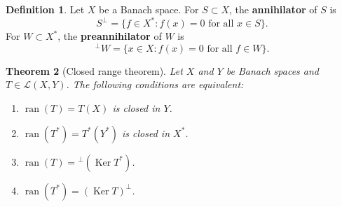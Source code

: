 \documentclass[a4paper,12pt]{book}
\DeclareMathOperator{\Ker}{Ker}
\DeclareMathOperator{\ran}{ran}
\theoremstyle{definition}
\newtheorem{definition}{Definition}[chapter]
\theoremstyle{plain}
\newtheorem{theorem}[definition]{Theorem}
\theoremstyle{remark}
\begin{document}
\begin{definition}\label{def:range-annihilator}
Let $X$ be a Banach space. For $S \subset X$, the \textbf{annihilator} of $S$ is
\[
  S^\perp = \{ f \in X^* : f(x) = 0 \text{ for all } x \in S \}.
\]
For $W \subset X^*$, the \textbf{preannihilator} of $W$ is
\[
  {}^\perp W = \{ x \in X : f(x) = 0 \text{ for all } f \in W \}.
\]
\end{definition}

\begin{theorem}[Closed range theorem]\label{thm:closed-range}
Let $X$ and $Y$ be Banach spaces and $T \in \mathcal{L}(X,Y)$. The following
conditions are equivalent:
\begin{enumerate}[label=(\roman*)]
  \item $\ran(T) = T(X)$ is closed in $Y$.
  \item $\ran(T^*) = T^*(Y^*)$ is closed in $X^*$.
  \item $\ran(T) = {}^\perp(\Ker T^*)$.
  \item $\ran(T^*) = (\Ker T)^\perp$.
\end{enumerate}
\end{theorem}
\end{document}
